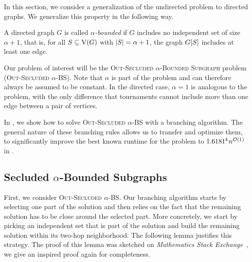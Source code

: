 \label{chap:tour}
\newcommand{\aboundedlong}{\textsc{Out-Secluded $\alpha$-Bounded Subgraph}}
\newcommand{\abounded}{\textsc{Out-Secluded $\alpha$-BS}}
\newcommand{\secuna}[1]{\textsc{Undirected Secluded {#1}-BS}}

In this section, we consider a generalization of the undirected \clique{} problem to directed graphs. We generalize this property in the following way.

\begin{definition}
    A directed graph $G$ is called \emph{$\alpha$-bounded} if $G$ includes no independent set of size $\alpha + 1$, that is, for all $S \subseteq \operatorname{V}({G})$ with $\abs{S} = \alpha + 1$, the graph ${G}[{S}]$ includes at least one edge.
\end{definition}

Our problem of interest will be the \aboundedlong{} problem (\abounded{}).
Note that $\alpha$ is part of the problem and can therefore always be assumed to be constant.
In the directed case, $\alpha = 1$ is analogous to the  problem, with the only difference that tournaments cannot include more than one edge between a pair of vertices.

In , we show how to solve \abounded{} with a branching algorithm. The general nature of these branching rules allows us to transfer and optimize them, to significantly improve the best known runtime for the \clique{} problem to $1.6181^kn^{\mathcal{O}(1)}$ in .

\subsection{Secluded \texorpdfstring{$\alpha$}{α}-Bounded Subgraphs}\label{sec:alpha_bounded}

First, we consider \abounded{}.
Our branching algorithm starts by selecting one part of the solution and then relies on the fact that the remaining solution has to be close around the selected part. More concretely, we start by picking an independent set that is part of the solution and build the remaining solution within its two-hop neighborhood. The following lemma justifies this strategy. 
The proof of this lemma was sketched on \emph{Mathematics Stack Exchange}~\cite{stackexchange}, we give an inspired proof again for completeness.

